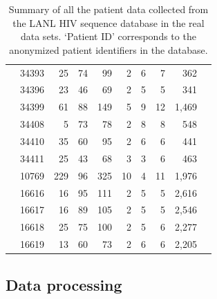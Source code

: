 \documentclass{bmcart}
\begin{document}
\begin{table}
\begin{center}
\begin{tabular}{llrrrrrrrr}
& 34393 &     25 &       74 &       99 &        2 &        6 &        7 & 362 \\
& 34396 &      23 &       46 &       69 &        2 &        5 &        5 & 341 \\
& 34399 &      61 &       88 &      149 &        5 &        9 &       12 & 1,469 \\
& 34408 &       5 &       73 &       78 &        2 &        8 &        8 & 548 \\
& 34410 &      35 &       60 &       95 &        2 &        6 &        6 & 441 \\
& 34411 &      25 &       43 &       68 &        3 &        3 &        6 & 463  \\
\cite{Fischer04} & 10769 &    229 &       96 &      325 &       10 &        4 &       11 & 1,976 \\ 
\cite{Llewellyn06} & 16616 &     16 &       95 &      111 &        2 &        5 &        5 & 2,616 \\
& 16617 &     16 &       89 &      105 &        2 &        5 &        5 & 2,546 \\
& 16618 &     25 &       75 &      100 &        2 &        5 &        6 & 2,277 \\
& 16619 &     13 &       60 &       73 &        2 &        6 &        6 & 2,205 \\
\hline
\end{tabular}
\end{center}
  \caption{
  {Summary of all the patient data collected from the LANL HIV sequence database \cite{LosAlamos} in the real data sets.}
  `Patient ID' corresponds to the anonymized patient identifiers in the database.
   }\label{tab:patients} 
\end{table}


\subsection * {Data processing}
\end{document}
